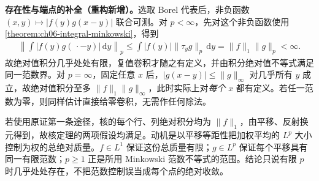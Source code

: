 \documentclass[../../main.tex]{subfiles}
\begin{document}
\begin{remark}
\textbf{存在性与端点的补全（重构新增）。}选取 Borel 代表后，非负函数 $(x,y)\mapsto|f(y)g(x-y)|$ 联合可测。对 $p<\infty$，先对这个非负函数使用\cref{theorem:ch06-integral-minkowski}，得到
\begin{align*}
\left\|\int|f(y)g(\,\cdot-y)|\,\mathrm dy\right\|_p
\leqslant\int|f(y)|\|\tau_yg\|_p\,\mathrm dy
=\|f\|_1\|g\|_p<\infty.
\end{align*}
故绝对值积分几乎处处有限，复值卷积才随之有定义，并由积分绝对值不等式满足同一范数界。对 $p=\infty$，固定任意 $x$ 后，$|g(x-y)|\leqslant\|g\|_\infty$ 对几乎所有 $y$ 成立，故绝对值积分至多 $\|f\|_1\|g\|_\infty$，此时实际上对\emph{每个} $x$ 都有定义。若任一范数为零，则同样估计直接给零卷积，无需作任何除法。

若使用原证第一条途径，核的每个行、列绝对积分均为 $\|f\|_1$，由平移、反射换元得到，故核定理的两项假设均满足。动机是以平移等距性把加权平均的 $L^p$ 大小控制为权的总绝对质量。$f\in L^1$ 保证这份总质量有限；$g\in L^p$ 保证每个平移具有同一有限范数；$p\geqslant1$ 正是所用 Minkowski 范数不等式的范围。结论只说有限 $p$ 时几乎处处存在，不把范数控制误当成每个点的绝对收敛。
\end{remark}

\end{document}
